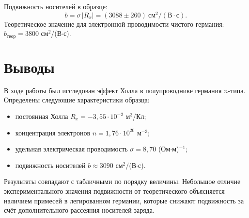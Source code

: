 \documentclass[a4paper,12pt]{article}
\begin{document}
Подвижность носителей в образце:
\begin{equation}
    b = \sigma\,|R_x| = (3088 \pm 260)\ \text{см}^2/(\text{В}\cdot\text{с}).
\end{equation}
Теоретическое значение для электронной проводимости чистого германия: $b_{\text{теор}} = 3800$ см$^2$/(В$\cdot$с).

\section{Выводы}
В ходе работы был исследован эффект Холла в полупроводнике германия $n$-типа. Определены следующие характеристики образца:
\begin{itemize}
    \item постоянная Холла $R_x = -3{,}55\cdot 10^{-2}$ м$^3$/Кл;
    \item концентрация электронов $n = 1{,}76\cdot 10^{20}$ м$^{-3}$;
    \item удельная электрическая проводимость $\sigma = 8{,}70$ (Ом$\cdot$м)$^{-1}$;
    \item подвижность носителей $b \approx 3090$ см$^2$/(В$\cdot$с).
\end{itemize}

Результаты совпадают с табличными по порядку величины. Небольшое отличие экспериментального значения подвижности от теоретического объясняется наличием примесей в легированном германии, которые снижают подвижность за счёт дополнительного рассеяния носителей заряда.
\end{document}
